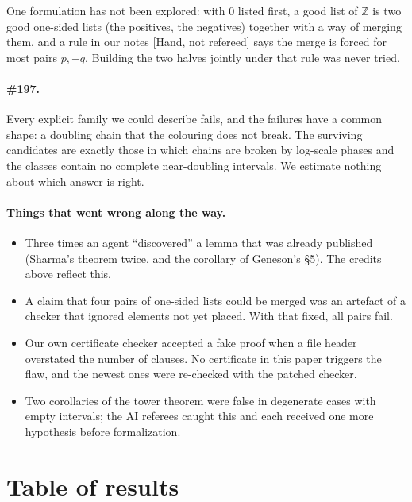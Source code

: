 \documentclass[11pt,letterpaper]{article}
\newcommand{\Z}{\mathbb{Z}}
\newcommand{\st}[1]{\textnormal{\textsf{\small[#1]}}}
\begin{document}
One formulation has not been explored: with 0 listed first, a good list of $\Z$ is two good one-sided lists
(the positives, the negatives) together with a way of merging them, and a rule in our notes
\st{Hand, not refereed} says the merge is forced for most pairs $p, -q$. Building the two halves jointly
under that rule was never tried.

\paragraph{\#197.} Every explicit family we could describe fails, and the failures have a common shape: a
doubling chain that the colouring does not break. The surviving candidates are exactly those in which
chains are broken by log-scale phases and the classes contain no complete near-doubling intervals. We
estimate nothing about which answer is right.

\paragraph{Things that went wrong along the way.}
\begin{itemize}
\item Three times an agent ``discovered'' a lemma that was already published (Sharma's theorem twice, and
the corollary of Geneson's \S5). The credits above reflect this.
\item A claim that four pairs of one-sided lists could be merged was an artefact of a checker that ignored
elements not yet placed. With that fixed, all pairs fail.
\item Our own certificate checker accepted a fake proof when a file header overstated the number of clauses.
No certificate in this paper triggers the flaw, and the newest ones were re-checked with the patched
checker.
\item Two corollaries of the tower theorem were false in degenerate cases with empty intervals; the AI
referees caught this and each received one more hypothesis before formalization.
\end{itemize}

\newpage
\section{Table of results}\label{sec:table}
\end{document}
